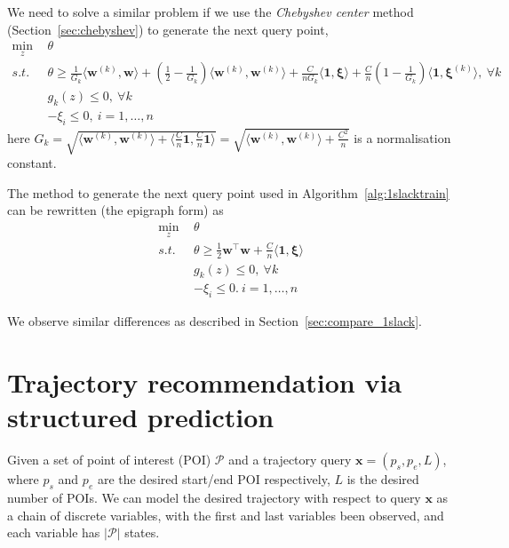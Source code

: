 \documentclass[9pt]{extarticle}
\begin{document}
We need to solve a similar problem if we use the \emph{Chebyshev center} method (Section~\ref{sec:chebyshev}) to generate the next query point,
\begin{equation}
\label{eq:nslack_chebyshev}
\begin{aligned}
\min_{z} ~& \theta \\
s.t.~~ ~& \theta \ge 
          \frac{1}{G_k} \langle \mathbf{w}^{(k)}, \mathbf{w} \rangle + 
          (\frac{1}{2} - \frac{1}{G_k}) \langle \mathbf{w}^{(k)}, \mathbf{w}^{(k)} \rangle + 
          \frac{C}{nG_k} \langle \mathbf{1}, \bm{\xi} \rangle + 
          \frac{C}{n} (1 - \frac{1}{G_k}) \langle \mathbf{1}, \bm{\xi}^{(k)} \rangle,~ \forall k \\
        & g_k(z) \le 0,~ \forall k \\
        & -\xi_i \le 0,~ i = 1, \dots, n
\end{aligned}
\end{equation}
here 
$G_k 
= \sqrt{\langle \mathbf{w}^{(k)}, \mathbf{w}^{(k)} \rangle + \langle \frac{C}{n} \mathbf{1}, \frac{C}{n} \mathbf{1} \rangle} 
= \sqrt{\langle \mathbf{w}^{(k)}, \mathbf{w}^{(k)} \rangle + \frac{C^2}{n}}$
is a normalisation constant.


The method to generate the next query point used in Algorithm~\ref{alg:1slacktrain} can be rewritten (the epigraph form) as
\begin{equation}
\label{eq:nslack_genquery}
\begin{aligned}
\min_{z} ~& \theta \\
s.t.~~ ~& \theta \ge \frac{1}{2} \mathbf{w}^\top \mathbf{w} + \frac{C}{n} \langle \mathbf{1}, \bm{\xi} \rangle \\
        & g_k(z) \le 0,~ \forall k \\
        & -\xi_i \le 0.~ i = 1, \dots, n
\end{aligned}
\end{equation}

We observe similar differences as described in Section~\ref{sec:compare_1slack}.


\section{Trajectory recommendation via structured prediction}
\label{sec:recommend}

Given a set of point of interest (POI) $\mathcal{P}$ and a trajectory query $\mathbf{x} = (p_s, p_e, L)$,
where $p_s$ and $p_e$ are the desired start/end POI respectively, $L$ is the desired number of POIs.
We can model the desired trajectory with respect to query $\mathbf{x}$ as a chain of discrete variables, 
with the first and last variables been observed, and each variable has $|\mathcal{P}|$ states.
\end{document}

